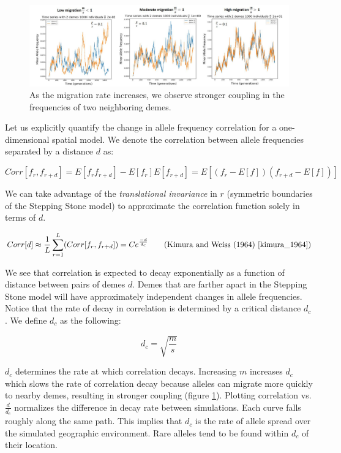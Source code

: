 \begin{figure}[h]
    \centering
    \hspace*{-2cm}
    \includegraphics[scale=0.5]{img/low_high_migration.JPG}
    \caption{As the migration rate increases, we observe stronger coupling in the frequencies of two neighboring demes.}
    \label{fig:low_high_m}
\end{figure}


Let us explicitly quantify the change in allele frequency correlation for a one-dimensional spatial model. We denote the correlation between allele frequencies separated by a distance $d$ as:

\begin{equation}
    Corr[f_r,f_{r+d}] = E[f_r f_{r+d}] - E[f_r] E[f_{r+d}] = E[(f_r - E[f])(f_{r+d} - E[f])]
\end{equation}

We can take advantage of the \textit{translational invariance} in $r$ (symmetric boundaries of the Stepping Stone model) to approximate the correlation function solely in terms of $d$.

\begin{equation}
    Corr[d] \approx \frac{1}{L} \sum_{r=1}^L (Corr[f_r,f_{r+d}]) = Ce^{\frac{-d}{d_c}} \tag{Kimura and Weiss (1964) \cite{kimura_1964}}
\end{equation}

We see that correlation is expected to decay exponentially as a function of distance between pairs of demes $d$. Demes that are farther apart in the Stepping Stone model will have approximately independent changes in allele frequencies. Notice that the rate of decay in correlation is determined by a critical distance $d_c$. We define $d_c$ as the following:

\begin{equation}
    d_c = \sqrt{\frac{m}{s}}
\end{equation}


$d_c$ determines the rate at which correlation decays. Increasing $m$ increases $d_c$ which slows the rate of correlation decay because alleles can migrate more quickly to nearby demes, resulting in stronger coupling (figure \ref{fig:low_high_m}). Plotting correlation vs. $\frac{d}{d_c}$ normalizes the difference in decay rate between simulations. Each curve falls roughly along the same path. This implies that $d_c$ is the rate of allele spread over the simulated geographic environment. Rare alleles tend to be found within $d_c$ of their location.


